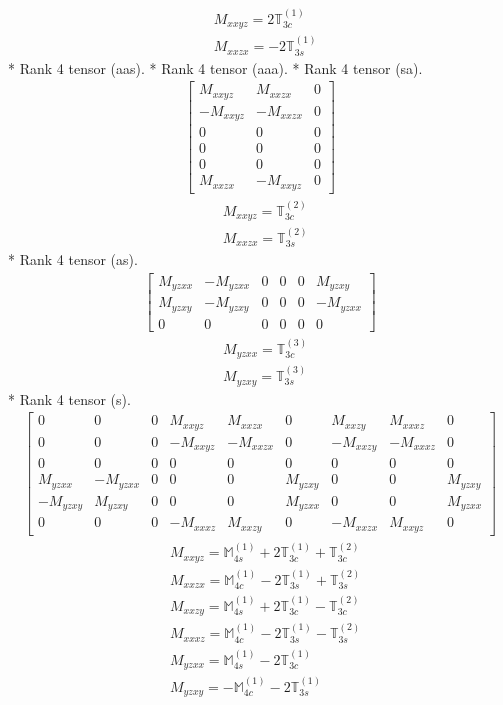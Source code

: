 \documentclass[fleqn,8pt,landscape]{jsarticle}
\begin{document}
\begin{align*}
& M_{xxyz} = 2 \mathbb{T}_{3c}^{(1)} \\
& M_{xxzx} = - 2 \mathbb{T}_{3s}^{(1)}
\end{align*}
* Rank 4 tensor (aas).
* Rank 4 tensor (aaa).
* Rank 4 tensor (sa).
\begin{align*}
\begin{bmatrix} M_{xxyz} & M_{xxzx} & 0 \\ - M_{xxyz} & - M_{xxzx} & 0 \\ 0 & 0 & 0 \\ 0 & 0 & 0 \\ 0 & 0 & 0 \\ M_{xxzx} & - M_{xxyz} & 0 \end{bmatrix}
\end{align*}
\begin{align*}
& M_{xxyz} = \mathbb{T}_{3c}^{(2)} \\
& M_{xxzx} = \mathbb{T}_{3s}^{(2)}
\end{align*}
* Rank 4 tensor (as).
\begin{align*}
\begin{bmatrix} M_{yzxx} & - M_{yzxx} & 0 & 0 & 0 & M_{yzxy} \\ M_{yzxy} & - M_{yzxy} & 0 & 0 & 0 & - M_{yzxx} \\ 0 & 0 & 0 & 0 & 0 & 0 \end{bmatrix}
\end{align*}
\begin{align*}
& M_{yzxx} = \mathbb{T}_{3c}^{(3)} \\
& M_{yzxy} = \mathbb{T}_{3s}^{(3)}
\end{align*}
* Rank 4 tensor (s).
\begin{align*}
\begin{bmatrix} 0 & 0 & 0 & M_{xxyz} & M_{xxzx} & 0 & M_{xxzy} & M_{xxxz} & 0 \\ 0 & 0 & 0 & - M_{xxyz} & - M_{xxzx} & 0 & - M_{xxzy} & - M_{xxxz} & 0 \\ 0 & 0 & 0 & 0 & 0 & 0 & 0 & 0 & 0 \\ M_{yzxx} & - M_{yzxx} & 0 & 0 & 0 & M_{yzxy} & 0 & 0 & M_{yzxy} \\ - M_{yzxy} & M_{yzxy} & 0 & 0 & 0 & M_{yzxx} & 0 & 0 & M_{yzxx} \\ 0 & 0 & 0 & - M_{xxxz} & M_{xxzy} & 0 & - M_{xxzx} & M_{xxyz} & 0 \end{bmatrix}
\end{align*}
\begin{align*}
& M_{xxyz} = \mathbb{M}_{4s}^{(1)} + 2 \mathbb{T}_{3c}^{(1)} + \mathbb{T}_{3c}^{(2)} \\
& M_{xxzx} = \mathbb{M}_{4c}^{(1)} - 2 \mathbb{T}_{3s}^{(1)} + \mathbb{T}_{3s}^{(2)} \\
& M_{xxzy} = \mathbb{M}_{4s}^{(1)} + 2 \mathbb{T}_{3c}^{(1)} - \mathbb{T}_{3c}^{(2)} \\
& M_{xxxz} = \mathbb{M}_{4c}^{(1)} - 2 \mathbb{T}_{3s}^{(1)} - \mathbb{T}_{3s}^{(2)} \\
& M_{yzxx} = \mathbb{M}_{4s}^{(1)} - 2 \mathbb{T}_{3c}^{(1)} \\
& M_{yzxy} = - \mathbb{M}_{4c}^{(1)} - 2 \mathbb{T}_{3s}^{(1)}
\end{align*}
\end{document}
